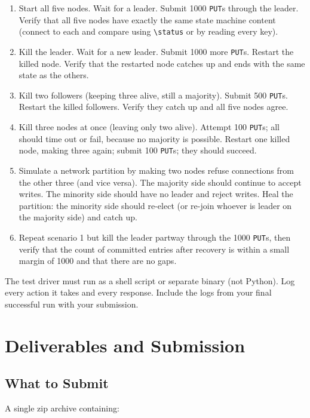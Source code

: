 \documentclass[11pt,a4paper]{article}
\begin{document}
\begin{enumerate}
\item Start all five nodes. Wait for a leader. Submit 1000 \texttt{PUT}s through the leader. Verify that all five nodes have exactly the same state machine content (connect to each and compare using \verb|\status| or by reading every key).

\item Kill the leader. Wait for a new leader. Submit 1000 more \texttt{PUT}s. Restart the killed node. Verify that the restarted node catches up and ends with the same state as the others.

\item Kill two followers (keeping three alive, still a majority). Submit 500 \texttt{PUT}s. Restart the killed followers. Verify they catch up and all five nodes agree.

\item Kill three nodes at once (leaving only two alive). Attempt 100 \texttt{PUT}s; all should time out or fail, because no majority is possible. Restart one killed node, making three again; submit 100 \texttt{PUT}s; they should succeed.

\item Simulate a network partition by making two nodes refuse connections from the other three (and vice versa). The majority side should continue to accept writes. The minority side should have no leader and reject writes. Heal the partition: the minority side should re-elect (or re-join whoever is leader on the majority side) and catch up.

\item Repeat scenario 1 but kill the leader partway through the 1000 \texttt{PUT}s, then verify that the count of committed entries after recovery is within a small margin of 1000 and that there are no gaps.
\end{enumerate}

The test driver must run as a shell script or separate binary (not Python). Log every action it takes and every response. Include the logs from your final successful run with your submission.

\section{Deliverables and Submission}

\subsection{What to Submit}
A single zip archive containing:
\end{document}

